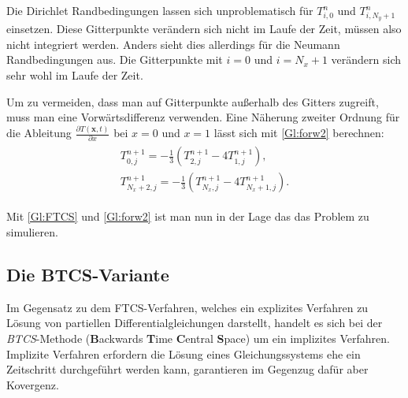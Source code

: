 Die Dirichlet Randbedingungen lassen sich unproblematisch für $T^{n}_{i,0}$ und $T^{n}_{i,N_y+1}$ einsetzen. Diese Gitterpunkte verändern sich nicht im Laufe der Zeit, müssen also nicht integriert werden.
Anders sieht dies allerdings für die Neumann Randbedingungen aus. Die Gitterpunkte mit $i=0$ und $i=N_x+1$ verändern sich sehr wohl im Laufe der Zeit.

Um zu vermeiden, dass man auf Gitterpunkte außerhalb des Gitters zugreift, muss man eine Vorwärtsdifferenz verwenden.
Eine Näherung zweiter Ordnung für die Ableitung $\frac{\partial T(\boldsymbol x,t)}{\partial x}$ bei $x=0$ und $x=1$ lässt sich mit \cref{Gl:forw2} berechnen:
\begin{align}
  \begin{split}
  T^{n+1}_{0,j} = -\frac{1}{3} \left( T^{n+1}_{2,j}-4T^{n+1}_{1,j}\right), \\
  T^{n+1}_{N_x+2,j} = -\frac{1}{3} \left( T^{n+1}_{N_x,j}-4T^{n+1}_{N_x+1,j}\right).
\end{split}\label{Gl:forw2}
\end{align}

Mit \cref{Gl:FTCS} und \cref{Gl:forw2} ist man nun in der Lage das das Problem zu simulieren.

\subsection{Die BTCS-Variante}
Im Gegensatz zu dem FTCS-Verfahren, welches ein explizites Verfahren zu Lösung von partiellen Differentialgleichungen darstellt, handelt es sich bei der \emph{BTCS}-Methode (\textbf{B}ackwards \textbf{T}ime \textbf{C}entral \textbf{S}pace) um ein implizites Verfahren.
Implizite Verfahren erfordern die Lösung eines Gleichungssystems ehe ein Zeitschritt durchgeführt werden kann, garantieren im Gegenzug dafür aber Kovergenz.

